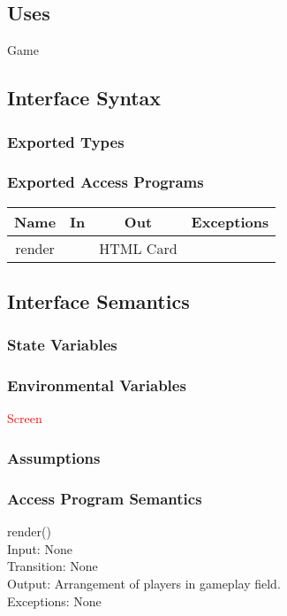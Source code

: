 \documentclass[12pt, titlepage]{article}
\begin{document}
\subsection{Uses}
Game
\subsection{Interface Syntax}
\subsubsection{Exported Types}
\subsubsection{Exported Access Programs}
\begin{tabular}[pos]{|c|c|c|c|}
\hline
\textbf{Name}& \textbf{In} & \textbf{Out} & \textbf{Exceptions} \\ \hline
 render & ~  & HTML Card  &~ \\ 
\hline
\end{tabular}


\subsection{Interface Semantics}
\subsubsection{State Variables}

\subsubsection{Environmental Variables}
\textcolor{red}{Screen}
\subsubsection{Assumptions}

\subsubsection{Access Program Semantics}

\noindent render()\\
Input: None\\
Transition: None\\
Output: Arrangement of players in gameplay field. \\
Exceptions: None \\
\end{document}
